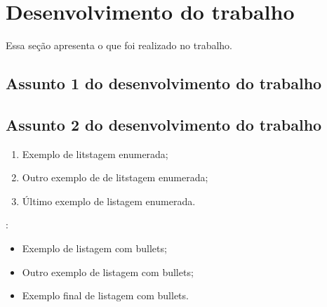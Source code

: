 \chapter{Desenvolvimento do trabalho}\label{cap:desenvolvimento_trabalho}
Essa seção apresenta o que foi realizado no trabalho.

\lipsum[22]

\section{Assunto 1 do desenvolvimento do trabalho}
\lipsum[23-27]

\section{Assunto 2 do desenvolvimento do trabalho}

\lipsum[23-27]

\begin{enumerate}
    \item Exemplo de litstagem enumerada;
    \item Outro exemplo de de litstagem enumerada;
    \item Último exemplo de listagem enumerada.
\end{enumerate}

\lipsum[28]:

\begin{itemize}
    \item Exemplo de listagem com bullets;
    \item Outro exemplo de listagem com bullets; 
    \item Exemplo final de listagem com bullets. 
\end{itemize}
